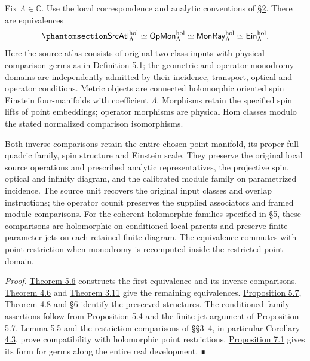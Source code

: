 \documentclass[
  english,
  11pt,
  reqno]{amsart}
\begin{document}
Fix \(\Lambda\in\mathbb C\). Use the local correspondence and analytic
conventions of \hyperref[sec:local-input-v08]{§2}. There are
equivalences
\begin{equation}\protect\phantomsection\label{eq:focused-holomorphic-correspondence-v08}{
\mathsf{SrcAtl}^{\mathrm{hol}}_\Lambda
\simeq
\mathsf{OpMon}^{\mathrm{hol}}_\Lambda
\simeq
\mathsf{MonRay}^{\mathrm{hol}}_\Lambda
\simeq
\mathsf{Ein}^{\mathrm{hol}}_\Lambda.
}\end{equation} Here the source atlas consists of original two-class
inputs with physical comparison germs as in
\hyperref[def:independent-original-source-atlas]{Definition 5.1}; the
geometric and operator monodromy domains are independently admitted by
their incidence, transport, optical and operator conditions. Metric
objects are connected holomorphic oriented spin Einstein four-manifolds
with coefficient \(\Lambda\). Morphisms retain the specified spin lifts
of point embeddings; operator morphisms are physical Hom classes modulo
the stated normalized comparison isomorphisms.

Both inverse comparisons retain the entire chosen point manifold, its
proper full quadric family, spin structure and Einstein scale. They
preserve the original local source operations and prescribed analytic
representatives, the projective spin, optical and infinity diagram, and
the calibrated module family on parametrized incidence. The source unit
recovers the original input classes and overlap instructions; the
operator counit preserves the supplied associators and framed module
comparisons. For the
\hyperref[def:conditioned-holomorphic-source-families]{coherent
holomorphic families specified in §5}, these comparisons are holomorphic
on conditioned local parents and preserve finite parameter jets on each
retained finite diagram. The equivalence commutes with point restriction
when monodromy is recomputed inside the restricted point domain.

\emph{Proof.}
\hyperref[thm:original-source-atlas-operator-equivalence]{Theorem 5.6}
constructs the first equivalence and its inverse comparisons.
\hyperref[thm:operator-monodromy-equivalence]{Theorem 4.6} and
\hyperref[thm:independent-monodromy-equivalence]{Theorem 3.11} give the
remaining equivalences.
\hyperref[prop:source-atlas-complete-diagram]{Proposition 5.7},
\hyperref[thm:global-parametrized-point-module-family]{Theorem 4.8} and
\hyperref[sec:spin-reality-v08]{§6} identify the preserved structures.
The conditioned family assertions follow from
\hyperref[prop:source-atlas-local-analytic-execution]{Proposition 5.4}
and the finite-jet argument of
\hyperref[prop:source-atlas-complete-diagram]{Proposition 5.7}.
\hyperref[lem:source-atlas-phase-completion]{Lemma 5.5} and the
restriction comparisons of
\hyperref[sec:global-null-monodromy-v08]{§§3--4}, in particular
\hyperref[cor:null-monodromy-first-unit-v08]{Corollary 4.3}, prove
compatibility with holomorphic point restrictions.
\hyperref[prop:recomputed-monodromy-restriction]{Proposition 7.1} gives
its form for germs along the entire real development. ∎
\end{document}
